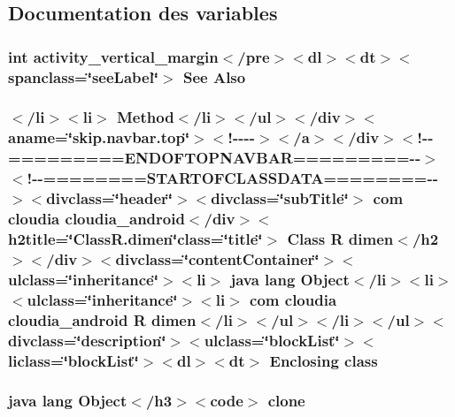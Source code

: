 \subsection{Documentation des variables}
\hypertarget{_r_8dimen_8html_ae9d781d9d920a2694522827b67611c7f}{
\subsubsection[{Also}]{\setlength{\rightskip}{0pt plus 5cm}int activity\-\_\-vertical\-\_\-margin$<$/pre$>$$<$dl$>$$<${\bf dt}$>$$<$spanclass=\char`\"{}see\-Label\char`\"{}$>$ See Also}}\label{_r_8dimen_8html_ae9d781d9d920a2694522827b67611c7f}
\hypertarget{_r_8dimen_8html_a7a3a52462a6d81f017a93e59e3b1f43b}{
\subsubsection[{class}]{\setlength{\rightskip}{0pt plus 5cm}$<$/li$>$$<$li$>$ Method$<$/li$>$$<$/ul$>$$<$/div$>$$<$aname=\char`\"{}skip.\-navbar.\-top\char`\"{}$>$$<$!-\/-\/-\/-\/$>$$<$/a$>$$<$/div$>$$<$!-\/-\/=========E\-N\-D\-O\-F\-T\-O\-P\-N\-A\-V\-B\-A\-R=========-\/-\/$>$$<$!-\/-\/========S\-T\-A\-R\-T\-O\-F\-C\-L\-A\-S\-S\-D\-A\-T\-A========-\/-\/$>$$<$divclass=\char`\"{}header\char`\"{}$>$$<$divclass=\char`\"{}sub\-Title\char`\"{}$>$ com cloudia cloudia\-\_\-android$<$/div$>$$<$h2title=\char`\"{}Class\-R.\-dimen\char`\"{}class=\char`\"{}title\char`\"{}$>$ Class {\bf R} {\bf dimen}$<$/h2$>$$<$/div$>$$<$divclass=\char`\"{}content\-Container\char`\"{}$>$$<$ulclass=\char`\"{}inheritance\char`\"{}$>$$<$li$>$ java lang Object$<$/li$>$$<$li$>$$<$ulclass=\char`\"{}inheritance\char`\"{}$>$$<$li$>$ com cloudia cloudia\-\_\-android {\bf R} {\bf dimen}$<$/li$>$$<$/ul$>$$<$/li$>$$<$/ul$>$$<$divclass=\char`\"{}description\char`\"{}$>$$<$ulclass=\char`\"{}block\-List\char`\"{}$>$$<$liclass=\char`\"{}block\-List\char`\"{}$>$$<$dl$>$$<${\bf dt}$>$ Enclosing class}}\label{_r_8dimen_8html_a7a3a52462a6d81f017a93e59e3b1f43b}
\hypertarget{_r_8dimen_8html_adc9607fcabf6f2d7f401ad52015ef6e0}{
\subsubsection[{clone}]{\setlength{\rightskip}{0pt plus 5cm}java lang Object$<$/h3$>$$<$code$>$ clone}}\label{_r_8dimen_8html_adc9607fcabf6f2d7f401ad52015ef6e0}
